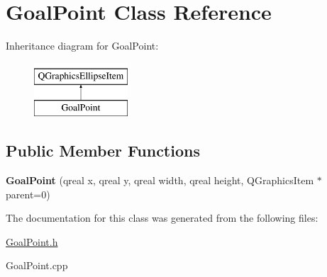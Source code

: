 \hypertarget{class_goal_point}{\section{Goal\-Point Class Reference}
\label{class_goal_point}
}
Inheritance diagram for Goal\-Point\-:\begin{figure}[H]
\begin{center}
\leavevmode
\includegraphics[height=2.000000cm]{class_goal_point}
\end{center}
\end{figure}
\subsection*{Public Member Functions}
\begin{DoxyCompactItemize}
\item 
\hypertarget{class_goal_point_aefa48894f0917222818f8773b2f6459f}{{\bfseries Goal\-Point} (qreal x, qreal y, qreal width, qreal height, Q\-Graphics\-Item $\ast$parent=0)}\label{class_goal_point_aefa48894f0917222818f8773b2f6459f}

\end{DoxyCompactItemize}


The documentation for this class was generated from the following files\-:\begin{DoxyCompactItemize}
\item 
\hyperlink{_goal_point_8h}{Goal\-Point.\-h}\item 
Goal\-Point.\-cpp\end{DoxyCompactItemize}
